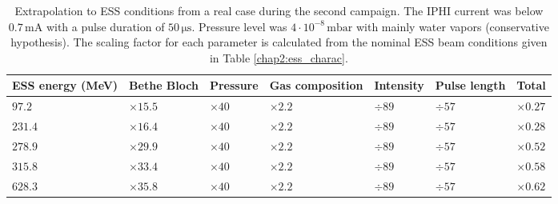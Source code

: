 \begin{table}[ht]
  \centering
  \caption[Extrapolation to ESS conditions from a real case during the second campaign]
  {Extrapolation to ESS conditions from a real case during the second campaign.
    The IPHI current was below $0.7\,\mathrm{mA}$ with a pulse duration of $50\, \mathrm{\mu s}$. Pressure level was $4 \cdot 10^{-8}\,\mathrm{mbar}$ with mainly water vapors (conservative hypothesis).
    The scaling factor for each parameter is calculated from the nominal ESS beam conditions given in Table \ref{chap2:ess_charac}.}
  \label{chap4:extrapolationMCP}
  \begin{tabularx}{\linewidth}{XXXXXXX}
    \toprule    ESS energy (MeV) & Bethe Bloch & Pressure     & Gas composition & Intensity & Pulse length & Total         \\
    \midrule
    \(97.2\)                     & $\times 15.5$ & $\times 40 $ & $\times 2.2$    & $\div89$  & $\div57$     & $\times 0.27$ \\
    \(231.4\)                    & $\times 16.4$ & $\times 40$  & $\times 2.2$    & $\div89$  & $\div57$     & $\times 0.28$ \\
    \(278.9\)                    & $\times 29.9$ & $\times 40$  & $\times 2.2$    & $\div89$  & $\div57$     & $\times 0.52$ \\
    \(315.8\)                    & $\times 33.4$ & $\times 40$  & $\times 2.2$    & $\div89$  & $\div57$     & $\times 0.58$ \\
    \(628.3\)                    & $\times 35.8$ & $\times 40$  & $\times 2.2$    & $\div89$  & $\div57$     & $\times 0.62$ \\
    \bottomrule
  \end{tabularx}
\end{table}